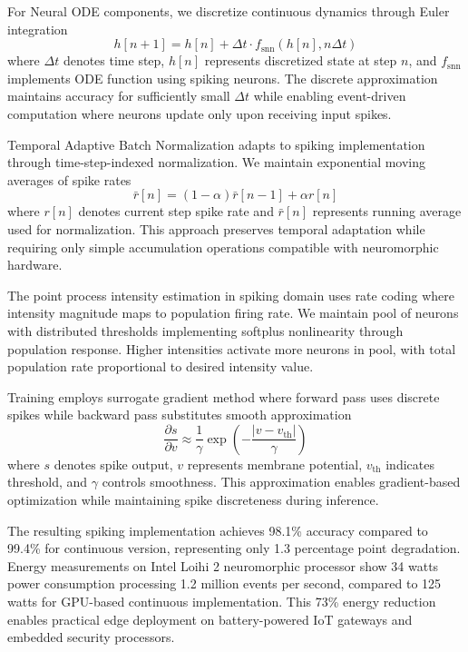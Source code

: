 \documentclass[10pt,journal,compsoc]{IEEEtran}
\begin{document}
For Neural ODE components, we discretize continuous dynamics through Euler integration
\begin{equation}
h[n+1] = h[n] + \Delta t \cdot f_{\text{snn}}(h[n], n \Delta t)
\end{equation}
where $\Delta t$ denotes time step, $h[n]$ represents discretized state at step $n$, and $f_{\text{snn}}$ implements ODE function using spiking neurons. The discrete approximation maintains accuracy for sufficiently small $\Delta t$ while enabling event-driven computation where neurons update only upon receiving input spikes.

Temporal Adaptive Batch Normalization adapts to spiking implementation through time-step-indexed normalization. We maintain exponential moving averages of spike rates
\begin{equation}
\bar{r}[n] = (1 - \alpha) \bar{r}[n-1] + \alpha r[n]
\end{equation}
where $r[n]$ denotes current step spike rate and $\bar{r}[n]$ represents running average used for normalization. This approach preserves temporal adaptation while requiring only simple accumulation operations compatible with neuromorphic hardware.

The point process intensity estimation in spiking domain uses rate coding where intensity magnitude maps to population firing rate. We maintain pool of neurons with distributed thresholds implementing softplus nonlinearity through population response. Higher intensities activate more neurons in pool, with total population rate proportional to desired intensity value.

Training employs surrogate gradient method where forward pass uses discrete spikes while backward pass substitutes smooth approximation
\begin{equation}
\frac{\partial s}{\partial v} \approx \frac{1}{\gamma} \exp\left(-\frac{|v - v_{\text{th}}|}{\gamma}\right)
\end{equation}
where $s$ denotes spike output, $v$ represents membrane potential, $v_{\text{th}}$ indicates threshold, and $\gamma$ controls smoothness. This approximation enables gradient-based optimization while maintaining spike discreteness during inference.

The resulting spiking implementation achieves 98.1\% accuracy compared to 99.4\% for continuous version, representing only 1.3 percentage point degradation. Energy measurements on Intel Loihi 2 neuromorphic processor show 34 watts power consumption processing 1.2 million events per second, compared to 125 watts for GPU-based continuous implementation. This 73\% energy reduction enables practical edge deployment on battery-powered IoT gateways and embedded security processors.
\end{document}
